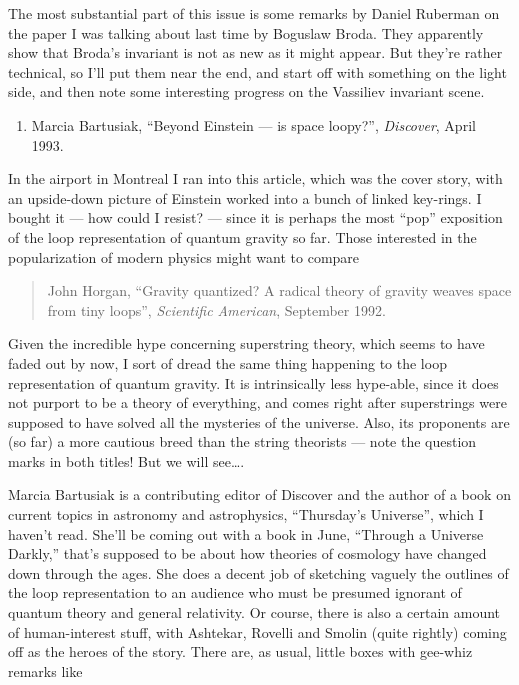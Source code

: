\documentclass[12pt]{article}
\def\tightlist{}
\begin{document}
The most substantial part of this issue is some remarks by Daniel
Ruberman on the paper I was talking about last time by Boguslaw Broda. They
apparently show that Broda's invariant is not as new as it might appear.
But they're rather technical, so I'll put them near the end, and start
off with something on the light side, and then note some interesting
progress on the Vassiliev invariant scene.

\begin{enumerate}
\def\labelenumi{\arabic{enumi})}
\tightlist
\item
  Marcia Bartusiak, ``Beyond Einstein --- is space loopy?'',
  \emph{Discover}, April 1993.
\end{enumerate}

In the airport in Montreal I ran into this article, which was the cover
story, with an upside-down picture of Einstein worked into a bunch of
linked key-rings. I bought it --- how could I resist? --- since it is
perhaps the most ``pop'' exposition of the loop representation of
quantum gravity so far. Those interested in the popularization of modern
physics might want to compare

\begin{quote}
{\rm John Horgan, ``Gravity quantized? A radical theory of gravity weaves space from tiny
loops'', \emph{Scientific American}, September 1992.}
\end{quote}

Given the incredible hype concerning superstring theory, which seems to
have faded out by now, I sort of dread the same thing happening to the
loop representation of quantum gravity. It is intrinsically less
hype-able, since it does not purport to be a theory of everything, and
comes right after superstrings were supposed to have solved all the
mysteries of the universe. Also, its proponents are (so far) a more
cautious breed than the string theorists --- note the question marks in
both titles! But we will see\ldots.

Marcia Bartusiak is a contributing editor of Discover and the author of
a book on current topics in astronomy and astrophysics, ``Thursday's
Universe'', which I haven't read. She'll be coming out with a book in
June, ``Through a Universe Darkly,'' that's supposed to be about how
theories of cosmology have changed down through the ages. She does a
decent job of sketching vaguely the outlines of the loop representation
to an audience who must be presumed ignorant of quantum theory and
general relativity. Or course, there is also a certain amount of
human-interest stuff, with Ashtekar, Rovelli and Smolin (quite rightly)
coming off as the heroes of the story. There are, as usual, little boxes
with gee-whiz remarks like
\end{document}

